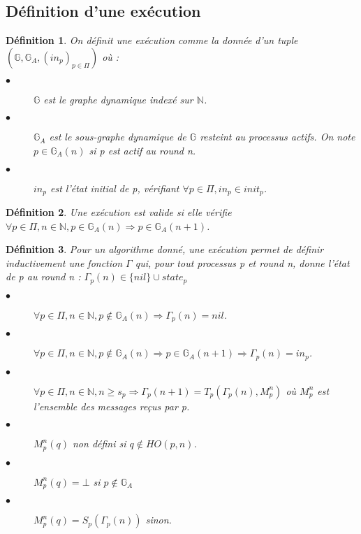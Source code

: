 \documentclass{article}
\newtheorem{definition}{Définition}
\begin{document}
\subsection{Définition d'une exécution}

\begin{definition}

On définit une exécution comme la donnée d'un tuple
$( \mathds{G},  \mathds{G}_A, (in_p)_{p \in \Pi})$ où :

\begin{description}

	\item[$\bullet$] $\mathds{G}$ est le graphe dynamique indexé sur $\mathds{N}$.
	\item[$\bullet$] $\mathds{G}_A$ est le sous-graphe dynamique de $\mathds{G}$ resteint au processus actifs.
		On note $p \in \mathds{G}_A(n)$ si p est actif au round n.
	\item[$\bullet$] $in_p$ est l'état initial de p, vérifiant $\forall p \in \Pi, in_p \in init_p$.

\end{description}
\end{definition}

\begin{definition}
	Une exécution est valide si elle vérifie $\forall p \in \Pi,  n \in \mathds{N},
			p \in \mathds{G}_A(n) \Rightarrow p \in \mathds{G}_A(n+1)$.
\end{definition}
\begin{definition}
	Pour un algorithme donné, une exécution permet de définir inductivement une fonction $\Gamma$ qui,
	pour tout processus p et round n, donne l'état de p au round n : $\Gamma_p(n) \in \{nil\} \cup state_p$
	\begin{description}
		\item[$\bullet$] $\forall p \in \Pi, n \in \mathds{N},
			p \notin \mathds{G}_A(n) \Rightarrow \Gamma_p(n) = nil$.
		\item[$\bullet$] $\forall p \in \Pi, n \in \mathds{N},
			p \notin \mathds{G}_A(n) \Rightarrow p \in \mathds{G}_A(n+1) \Rightarrow \Gamma_p(n) = in_p$.
		\item[$\bullet$] $\forall p \in \Pi,  n \in \mathds{N}, n \geq s_p \Rightarrow
			\Gamma_p(n+1) = T_p (\Gamma_p(n) ,M_p^n)$ où $M_p^n$ est l'ensemble des messages reçus par p.
		\item[$\bullet$] $M_p^n(q)$ non défini si $q \notin HO(p, n)$.
		\item[$\bullet$] $M_p^n(q) = \bot$ si $p \notin \mathds{G}_A$
		\item[$\bullet$] $M_p^n(q) = S_p (\Gamma_p(n))$ sinon.

	\end{description}
\end{definition}
\end{document}
